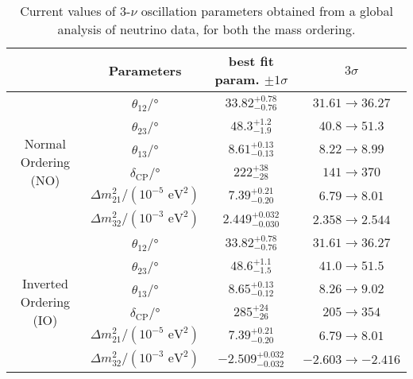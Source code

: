 \begin{table}
    \centering
        \begin{tabular}{|c||c|c|c|} 
        \hline
            & Parameters & best fit param. $\pm 1\sigma$ & $3\sigma$ \\
        \hline
        \hline
        \multirow{6}{4em}{Normal Ordering (NO)} & $\theta_{12}/$° & $33.82^{+0.78}_{-0.76}$ & $31.61 \rightarrow 36.27$\\ 
        \cline{2-4}
        & $\theta_{23}/$° & $48.3^{+1.2}_{-1.9}$ & $40.8 \rightarrow 51.3$\\
        \cline{2-4}
        & $\theta_{13}/$° & $8.61^{+0.13}_{-0.13}$ & $8.22 \rightarrow 8.99$\\
        \cline{2-4}
        & $\delta_{\text{CP}}/$° & $222^{+38}_{-28}$ & $141 \rightarrow 370$\\
        \cline{2-4}
        & $\Delta m^2_{21}/(10^{-5} \text{ eV}^2)$ & $7.39^{+0.21}_{-0.20}$ & $6.79 \rightarrow 8.01$\\
        \cline{2-4}
        & $\Delta m^2_{32}/(10^{-3} \text{ eV}^2)$ & $2.449^{+0.032}_{-0.030}$ & $2.358 \rightarrow 2.544$\\
        \hline
        \hline
        \multirow{6}{4em}{Inverted Ordering (IO)} & $\theta_{12}/$° & $33.82^{+0.78}_{-0.76}$ & $31.61 \rightarrow 36.27$\\ 
        \cline{2-4}
        & $\theta_{23}/$° & $48.6^{+1.1}_{-1.5}$ & $41.0 \rightarrow 51.5$\\
        \cline{2-4}
        & $\theta_{13}/$° & $8.65^{+0.13}_{-0.12}$ & $8.26 \rightarrow 9.02$\\
        \cline{2-4}
        & $\delta_{\text{CP}}/$° & $285^{+24}_{-26}$ & $205 \rightarrow 354$\\
        \cline{2-4}
        & $\Delta m^2_{21}/(10^{-5} \text{ eV}^2)$ & $7.39^{+0.21}_{-0.20}$ & $6.79 \rightarrow 8.01$\\
        \cline{2-4}
        & $\Delta m^2_{32}/(10^{-3} \text{ eV}^2)$ & $- 2.509^{+0.032}_{-0.032}$ & $- 2.603 \rightarrow - 2.416$\\
        \hline
        \end{tabular}
    \caption{Current values of 3-$\nu$ oscillation parameters obtained from a global analysis of neutrino data, for both the mass ordering. \cite{pdg:2022ynf}}
    \label{tab:all_pars}
\end{table}

